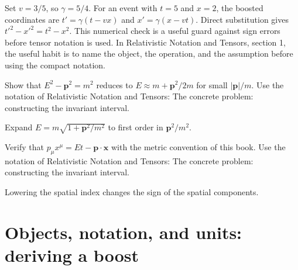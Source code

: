 \begin{example}
Set \(v=3/5\), so \(\gamma=5/4\).  For an event with \(t=5\) and \(x=2\), the boosted coordinates are \(t'=\gamma(t-vx)\) and \(x'=\gamma(x-vt)\).  Direct substitution gives \(t'^2-x'^2=t^2-x^2\).  This numerical check is a useful guard against sign errors before tensor notation is used.  In Relativistic Notation and Tensors, section 1, the useful habit is to name the object, the operation, and the assumption before using the compact notation.
\end{example}



\begin{exercise}
Show that \(E^2-\bm p^2=m^2\) reduces to \(E\approx m+\bm p^2/2m\) for small \(|\bm p|/m\).  Use the notation of Relativistic Notation and Tensors: The concrete problem: constructing the invariant interval.
\begin{answer}
Expand \(E=m\sqrt{1+\bm p^2/m^2}\) to first order in \(\bm p^2/m^2\).
\end{answer}
\end{exercise}

\begin{exercise}
Verify that \(p_\mu x^\mu=Et-\bm p\cdot\bm x\) with the metric convention of this book.  Use the notation of Relativistic Notation and Tensors: The concrete problem: constructing the invariant interval.
\begin{answer}
Lowering the spatial index changes the sign of the spatial components.
\end{answer}
\end{exercise}



\section{Objects, notation, and units: deriving a boost}













